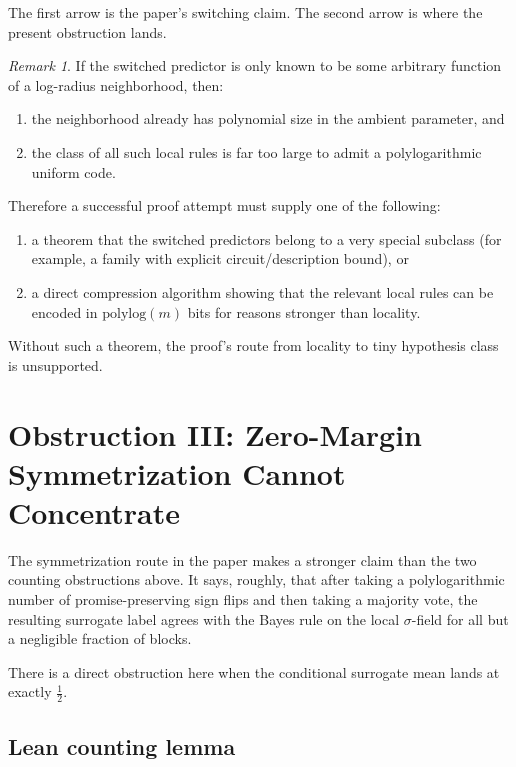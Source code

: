 \documentclass[11pt]{article}
\theoremstyle{remark}
\newtheorem{remark}[theorem]{Remark}
\begin{document}
The first arrow is the paper's switching claim.  The second arrow is where the present obstruction
lands.

\begin{remark}
If the switched predictor is only known to be some arbitrary function of a log-radius neighborhood,
then:
\begin{enumerate}[leftmargin=1.5em]
  \item the neighborhood already has polynomial size in the ambient parameter, and
  \item the class of all such local rules is far too large to admit a polylogarithmic uniform code.
\end{enumerate}
\end{remark}

Therefore a successful proof attempt must supply one of the following:
\begin{enumerate}[leftmargin=1.5em]
  \item a theorem that the switched predictors belong to a very special subclass
  (for example, a family with explicit circuit/description bound), or
  \item a direct compression algorithm showing that the relevant local rules can be encoded in
  \(\mathrm{polylog}(m)\) bits for reasons stronger than locality.
\end{enumerate}

Without such a theorem, the proof's route from locality to tiny hypothesis class is unsupported.

\section{Obstruction III: Zero-Margin Symmetrization Cannot Concentrate}

The symmetrization route in the paper makes a stronger claim than the two counting obstructions
above.  It says, roughly, that after taking a polylogarithmic number of promise-preserving sign
flips and then taking a majority vote, the resulting surrogate label agrees with the Bayes rule on
the local $\sigma$-field for all but a negligible fraction of blocks.

There is a direct obstruction here when the conditional surrogate mean lands at exactly
\(\tfrac12\).

\subsection{Lean counting lemma}
\end{document}
